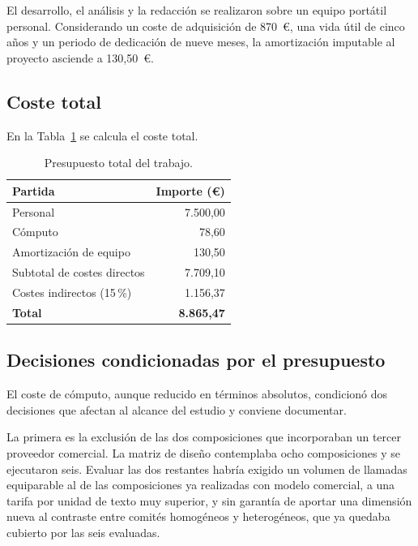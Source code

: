 El desarrollo, el análisis y la redacción se realizaron sobre un equipo portátil personal. Considerando un coste de adquisición de 870~\euro, una vida útil de cinco años y un periodo de dedicación de nueve meses, la amortización imputable al proyecto asciende a 130,50~\euro.


\subsection{Coste total}

En la Tabla~\ref{tab:presupuesto_total} se calcula el coste total.

\begin{table}[htbp]
	\centering
	\caption{Presupuesto total del trabajo.}
	\label{tab:presupuesto_total}
	\small
	\begin{tabular}{p{6.5cm} r}
		\hline
		\textbf{Partida} & \textbf{Importe (\euro)} \\
		\hline
		Personal & 7.500,00 \\
		Cómputo & 78,60 \\
		Amortización de equipo & 130,50 \\
		\hline
		Subtotal de costes directos & 7.709,10 \\
		Costes indirectos (15\,\%) & 1.156,37 \\
		\hline
		\textbf{Total} & \textbf{8.865,47} \\
		\hline
	\end{tabular}
\end{table}

\subsection{Decisiones condicionadas por el presupuesto}
\label{subsec:resticciones_presupuesto}

El coste de cómputo, aunque reducido en términos absolutos, condicionó dos decisiones que afectan al alcance del estudio y conviene documentar.

La primera es la exclusión de las dos composiciones que incorporaban un tercer proveedor comercial. La matriz de diseño contemplaba ocho composiciones y se ejecutaron seis. Evaluar las dos restantes habría exigido un volumen de llamadas equiparable al de las composiciones ya realizadas con modelo comercial, a una tarifa por unidad de texto muy superior, y sin garantía de aportar una dimensión nueva al contraste entre comités homogéneos y heterogéneos, que ya quedaba cubierto por las seis evaluadas.

